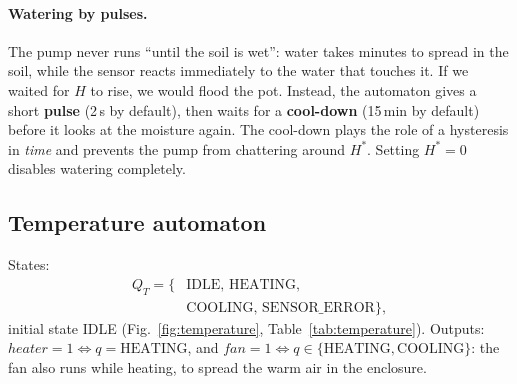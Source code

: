 \documentclass[10pt,a4paper,twocolumn]{article}
\begin{document}
\paragraph{Watering by pulses.} The pump never runs ``until the soil is wet'': water
takes minutes to spread in the soil, while the sensor reacts immediately to the water
that touches it. If we waited for $H$ to rise, we would flood the pot. Instead, the
automaton gives a short \textbf{pulse} (2\,s by default), then waits for a
\textbf{cool-down} (15\,min by default) before it looks at the moisture again. The
cool-down plays the role of a hysteresis in \emph{time} and prevents the pump from
chattering around $H^*$. Setting $H^*=0$ disables watering completely.

\subsection{Temperature automaton}
States:
\[\begin{aligned}Q_T=\{&\text{IDLE},\,\text{HEATING},\\&\text{COOLING},\,\text{SENSOR\_ERROR}\},\end{aligned}\]
initial state IDLE (Fig.~\ref{fig:temperature}, Table~\ref{tab:temperature}).
Outputs: $\mathit{heater}=1\iff q=\text{HEATING}$, and $\mathit{fan}=1\iff
q\in\{\text{HEATING},\text{COOLING}\}$: the fan also runs while heating, to spread the
warm air in the enclosure.
\end{document}

